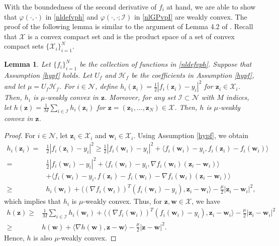 \documentclass[10pt,reqno]{amsart}
\newcommand{\1}{{\chi}}
\def\geq{\geqslant}
\numberwithin{equation}{section}
\theoremstyle{thmlemcorr}
\numberwithin{theorem}{section}
\newtheorem{lemma}[theorem]{Lemma}
\theoremstyle{thmlemcorr*}
\theoremstyle{defi}
\theoremstyle{remexample}
\theoremstyle{ass}
\begin{document}
With the boundedness of the second derivative of $f_i$ at hand, we are able to show that $\varphi(\cdot, \cdot)$ in \eqref{nldefvph} and $\varphi(\cdot, \cdot; \mathcal{I})$ in \eqref{nlGPvpI} are weakly convex. The proof of the following lemma is similar to the argument of Lemma 4.2 of \cite{drusvyatskiy2019efficiency}. Recall that $\mathcal{X}$ is a convex compact set and is the product space of a set of convex compact sets $\{\mathcal{X}_i\}_{i=1}^N$.  
\begin{lemma}
	\label{wcvxt}
	Let $\{f_i\}_{i=1}^N$ be the collection of functions in \eqref{nldefvph}. 
	Suppose that Assumption \ref{hypf} holds. Let $U_f$ and $\mathcal{H}_f$ be the coefficients in Assumption \ref{hypf}, and let $\mu=U_f\mathcal{H}_f$. For $i\in \mathcal{N}$, define $h_i(\boldsymbol{z}_i)=\frac{1}{2}|f_i(\boldsymbol{z}_i)-{y}_i|^2$ for $\boldsymbol{z}_i\in \mathcal{X}_i$. Then, $h_i$ is $\mu$-weakly convex in $\boldsymbol{z}$. Moreover, for any set $\mathcal{I}\subset \mathcal{N}$ with $M$ indices, let $h(\boldsymbol{z}) = \frac{1}{M}\sum_{i\in \mathcal{I}}h_i(\boldsymbol{z}_i)$ for $\boldsymbol{z}=(\boldsymbol{z}_1,\dots,\boldsymbol{z}_N)\in\mathcal{X}$. Then, $h$ is $\mu$-weakly convex in $\boldsymbol{z}$. 
\end{lemma}
\begin{proof}
	For $i\in \mathcal{N}$, let $\boldsymbol{z}_i\in \mathcal{X}_i$ and $\boldsymbol{w}_i\in \mathcal{X}_i$.  Using Assumption \ref{hypf}, we obtain
	\begin{align}
		h_i(\boldsymbol{z}_i) =& \frac{1}{2}|f_i(\boldsymbol{z}_i) - {y}_i|^2 \geq \frac{1}{2}|f_i(\boldsymbol{w}_i) - {y}_i|^2 + \langle f_i(\boldsymbol{w}_i)-{y}_i, f_i(\boldsymbol{z}_i )- f_i(\boldsymbol{w}_i)\rangle\nonumber \\
		=& \frac{1}{2}|f_i(\boldsymbol{w}_i) - {y}_i|^2 + \langle f_i(\boldsymbol{w}_i) - {y}_i, \nabla f_i(\boldsymbol{w}_i)(\boldsymbol{z}_i - \boldsymbol{w}_i)\rangle \nonumber\\
		& + \langle f_i(\boldsymbol{w}_i) - {y}_i, f(\boldsymbol{z}_i) - f_i(\boldsymbol{w}_i) - \nabla f_i(\boldsymbol{w}_i)(\boldsymbol{z}_i - \boldsymbol{w}_i)\rangle\nonumber\\
		\geq & h_i(\boldsymbol{w}_i) + \langle (\nabla f_i(\boldsymbol{w}_i))^T(f_i(\boldsymbol{w}_i) - {y}_i), \boldsymbol{z}_i - \boldsymbol{w}_i\rangle - \frac{\mu}{2}|\boldsymbol{z}_i - \boldsymbol{w}_i|^2,\nonumber
	\end{align}
	which implies that $h_i$ is $\mu$-weakly convex. Thus, for $\boldsymbol{z}, \boldsymbol{w}\in \mathcal{X}$, we have
	\begin{align}
		h(\boldsymbol{z})  \geq & \frac{1}{M}\sum_{i\in \mathcal{I}} h_i(\boldsymbol{w}_i) + \langle (\nabla f_i(\boldsymbol{w}_i))^T(f_i(\boldsymbol{w}_i) - {y}_i), \boldsymbol{z}_i - \boldsymbol{w}_i\rangle - \frac{\mu}{2}|\boldsymbol{z}_i - \boldsymbol{w}_i|^2 \nonumber\\
		\geq & h(\boldsymbol{w}) + \langle \nabla h(\boldsymbol{w}), \boldsymbol{z} - \boldsymbol{w}\rangle - \frac{\mu}{2}|\boldsymbol{z}-\boldsymbol{w}|^2. \nonumber
	\end{align}
	Hence, $h$ is also $\mu$-weakly convex. 
\end{proof}
\end{document}
